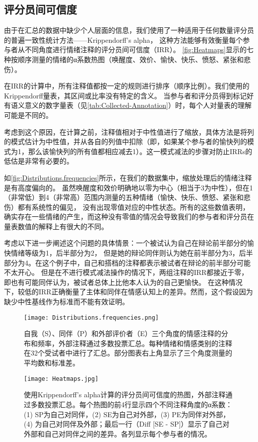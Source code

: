 \subsection{评分员间可信度}
由于在汇总的数据中缺少个人层面的信息，我们使用了一种适用于任何数量评分员的普遍一致性统计方法——Krippendorff's alpha，
这种方法能够有效衡量每个参与者从不同角度进行情绪注释的评分员间可信度（IRR）。
\autoref{fig:Heatmaps}显示的七种按顺序测量的情绪的α系数热图（唤醒度、效价、愉快、快乐、愤怒、紧张和悲伤）。

在IRR的计算中，所有注释值都按一定的规则进行排序（顺序比例）。我们使用的Krippendorff量表，其区间或比率没有特定的含义。
当参与者和评分员得到标记好有语义意义的数字量表（见\autoref{tab:Collected-Annotation}）时，每个人对量表的理解可能是不同的。

考虑到这个原因，在计算之前，注释值相对于中性值进行了缩放，具体方法是将列的模式估计为中性值，并从各自的列值中扣除（即，如果某个参与者的愉快列的模式为1，那么该愉快列的所有值都相应减去1）。这一模式减法的步骤对防止IRRs的低估是非常有必要的。

如\autoref{fig:Distributions.frequencies}所示，在我们的数据集中，缩放处理后的情绪注释是有高度偏向的。
虽然唤醒度和效价明确地以零为中心（相当于3为中性），但在1（非常低）到4（非常高）范围内测量的五种情绪（愉快、快乐、愤怒、紧张和悲伤）都有系统性的偏见，
没有出现零值对应的中性状态。所有的这些数值表明，确实存在一些情绪的产生，而这种没有零值的情况会导致我们的参与者和评分员在量表数值的解释上有很大的不同。

考虑以下进一步阐述这个问题的具体情景：一个被试认为自己在辩论前半部分的愉快情绪等级为1，后半部分为2，
但是她的辩论同伴则认为她在前半部分为3，后半部分为4。在这个例子中，自己和搭档的注释都表示被试者在辩论的前半部分可能不太开心。
但是在不进行模式减法操作的情况下，两组注释的IRR都接近于零，即也有可能同伴认为，被试者总体上比他本人认为的自己更愉快。
在这种情况下，较低的IRR正确衡量了主体和同伴在情感认知上的差异。然而，这个假设因为缺少中性基线作为标准而不能有效证明。
\begin{figure}[htbp]
    \centering
    \texttt{[image: Distributions.frequencies.png]}
    \caption[自我（S）、同伴（P）和外部评价者（E）三个角度的情感注释的分布和频率]{自我（S）、同伴（P）和外部评价者（E）三个角度的情感注释的分布和频率，外部注释通过多数投票汇总。每种情绪和情感类别的注释在32个受试者中进行了汇总。部分图表右上角显示了三个角度测量的平均数和标准差。}{\label{fig:Distributions.frequencies}}
\end{figure}
\begin{figure}[htbp]
    \centering
    \texttt{[image: Heatmaps.jpg]}
    \caption[使用Krippendorff's alpha计算的评分员间可信度的热图]{使用Krippendorff's alpha计算的评分员间可信度的热图，外部注释通过多数投票汇总。每个热图的前4行显示四个不同注释角度的α系数：(1) SP为自己对同伴，(2) SE为自己对外部，(3) PE为同伴对外部，(4) 为自己对同伴及外部；最后一行（Diff [SE - SP]）显示了自己对外部和自己对同伴之间的差异。各列显示每个参与者的情况。}{\label{fig:Heatmaps}}
\end{figure}

